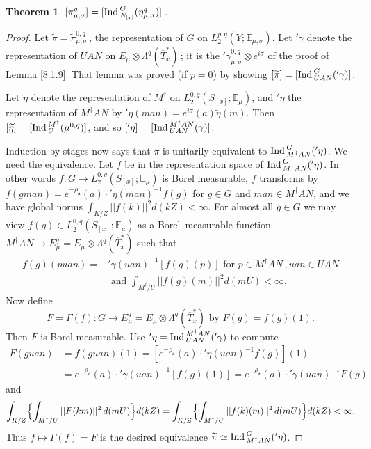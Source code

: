 \documentclass{conm-p-l}
\newtheorem{theorem}[equation]{Theorem}
\def\ga{\mathfrak{a}}
\def\Ind{{\rm Ind\,}}
\def\E{\mathbb{E}}
\begin{document}
\begin{theorem}\label{8.2.2} $[\pi_{\mu,\sigma}^q] = 
[\Ind_{N_{[x]}}^G(\eta_{\mu,\sigma}^q)]$\,.
\end{theorem}

\begin{proof}
Let $\widetilde{\pi} = \widetilde{\pi}_{\mu,\sigma}^{0,q}$\,, the
representation of $G$ on $L_2^{p,q}(Y;\E_{\mu,\sigma})$.  Let $'\gamma$ denote 
the representation of $UAN$ on $E_\mu \otimes \Lambda^q(\overline{T}_x^*)$\,;
it is the ${'\gamma}_{\mu,\sigma}^{0,q}\otimes e^{i\sigma}$ of the proof of
Lemma \ref{8.1.9}.  That lemma was proved (if $p = 0$) by showing
$[\widetilde{\pi}] = [\Ind_{UAN}^G({'\gamma})]$.

Let $\widetilde{\eta}$ denote the representation of $M^\dagger$ on
$L_2^{0,q}(S_{[x]};\E_\mu)$, and $'\eta$ the representation of
$M^\dagger AN$ by ${'\eta}(man) = e^{i\sigma}(a)\widetilde{\eta}(m)$.  Then
$[\widetilde{\eta}] = [\Ind_U^{M^\dagger}(\mu^{0,q})]$, and so $[{'\eta}]
= [\Ind_{UAN}^{M^\dagger AN}(\gamma)]$.

Induction by stages now says that $\widetilde{\pi}$ is unitarily 
equivalent to $\Ind_{M^\dagger AN}^{G}('\eta)$.  We need the equivalence.
Let $f$ be in the representation space of 
$\Ind_{M^\dagger AN}^{G}('\eta)$.  In other words 
$f: G \to L_2^{0,q}(S_{[x]};\E_\mu)$ is Borel measurable,
$f$ transforms by
$f(gman) = e^{-\rho_\ga}(a)\cdot {'\eta}(man)^{-1}f(g)$ for $g \in G$ and
$man \in M^\dagger AN$, and we have global norms 
$\int_{K/Z} ||f(k)||^2 d(kZ) < \infty$.  For almost all $g \in G$ we may view
$f(g) \in L_2^{0,q}(S_{[x]}; \E_\mu)$ as a Borel--measurable function
$M^\dagger AN \to E_\mu^q = E_\mu\otimes \Lambda^q(\overline{T}_x^*)$ such that
$$
\begin{aligned}
f(g)(puan) = &{'\gamma}(uan)^{-1}[f(g)(p)] \text{ for } p \in M^\dagger AN\,, 
	uan \in UAN \\
&\text{ and } \int_{M^\dagger/U}||f(g)(m)||^2d(mU) < \infty.
\end{aligned}
$$
Now define
\begin{equation}\label{8.2.3}
F = \Gamma(f): G \to E_\mu^q = E_\mu\otimes \Lambda^q(\overline{T}_x^*) 
	\text{ by } F(g) = f(g)(1).
\end{equation}
Then $F$ is Borel measurable.  Use ${'\eta}=\Ind_{UAN}^{M^\dagger AN}('\gamma)$
to compute
$$
\begin{aligned}
F(guan) &= f(guan)(1) = [e^{-\rho_\ga}(a)\cdot {'\eta}(uan)^{-1}f(g)](1) \\
&= e^{-\rho_\ga}(a)\cdot  {'\gamma}(uan)^{-1}[f(g)(1)] 
		= e^{-\rho_\ga}(a)\cdot {'\gamma}(uan)^{-1}F(g)
\end{aligned}
$$
and
{\small
$$
\int_{K/Z}\Bigl \{ \int_{M^\dagger /U} ||F(km)||^2\,d(mU)\Bigr \} d(kZ)
= \int_{K/Z}\Bigl \{ \int_{M^\dagger /U} ||f(k)(m)||^2\, d(mU)\Bigr \} d(kZ)
< \infty.
$$
}
Thus $f \mapsto \Gamma(f) = F$ is the desired equivalence
$\widetilde{\pi} \simeq \Ind_{M^\dagger AN}^{G}('\eta)$.


\end{proof}
\end{document}
